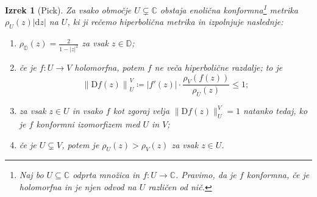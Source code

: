 \documentclass[a4paper, oneside]{amsart}
\newcommand{\RR}{\mathbb{R}}
\newcommand{\CC}{\mathbb{C}}
\newcommand{\DD}{\mathbb{D}}
\theoremstyle{plain}
\newtheorem{theorem}{Izrek}[section]
\newtheorem{lemma}[theorem]{Lema}
\theoremstyle{definition}
\begin{document}




\begin{theorem}[Pick] \label{pick}
    Za vsako območje \(U \subsetneq \CC\) obstaja enolična konformna\footnote{Naj
    bo \(U \subseteq \CC\) odprta množica in \(f \colon U \to \CC\). Pravimo, da
    je \(f\) \emph{konformna}, če je holomorfna in je njen odvod na \(U\) različen
    od nič.} metrika \(\rho_U (z) |\mathrm{d} z|\) na \(U\), ki ji rečemo
    \emph{hiperbolična metrika} in izpolnjuje naslednje:
    \begin{enumerate}
        \item \(\rho_\DD (z) = \frac{2}{1 - |z|^2}\) za vsak \(z \in \DD\);
        \item če je \(f \colon U \to V\) holomorfna, potem \(f\) ne veča
            hiperbolične razdalje; to je
            \[\left\| \mathrm{D} f (z) \right\|_U^V \coloneq \left| f' (z) \right| \cdot \frac{\rho_V (f (z))}{\rho_U (z)} \leq 1;\]
        \item za vsak \(z \in U\) in vsako \(f\) kot zgoraj velja
            \(\|\mathrm{D} f (z)\|_U^V = 1\) natanko tedaj, ko je \(f\) konformni
            izomorfizem med \(U\) in \(V\);
        \item če je \(U \subsetneq V\), potem je \(\rho_U (z) > \rho_V (z)\)
            za vsak \(z \in U\).
    \end{enumerate}
\end{theorem}
\end{document}
